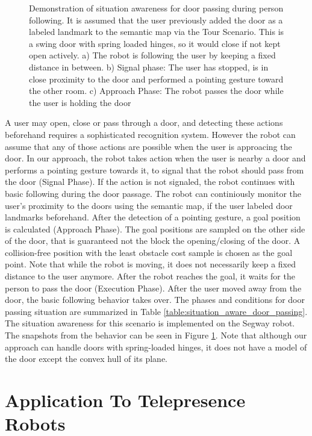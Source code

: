 \begin{figure}[ht!]
{        }
    \caption{Demonstration of situation awareness for door passing during person following. It is assumed that the user previously added the door as a labeled landmark to the semantic map via the Tour Scenario. This is a swing door with spring loaded hinges, so it would close if not kept open actively. a) The robot is following the user by keeping a fixed distance in between. b) Signal phase: The user has stopped, is in close proximity to the door and performed a pointing gesture toward the other room. c) Approach Phase: The robot passes the door while the user is holding the door}
   \label{fig:situtation_aware_door_passing}
\end{figure}

A user may open, close or pass through a door, and detecting these actions beforehand requires a sophisticated recognition system. However the robot can assume that any of those actions are possible when the user is approacing the door. In our approach, the robot takes action when the user is nearby a door and performs a pointing gesture towards it, to signal that the robot should pass from the door (Signal Phase). If the action is not signaled, the robot continues with basic following during the door passage. The robot can continiously monitor the user's proximity to the doors using the semantic map, if the user labeled door landmarks beforehand. After the detection of a pointing gesture, a goal position is calculated (Approach Phase). The goal positions are sampled on the other side of the door, that is guaranteed not the block the opening/closing of the door. A collision-free position with the least obstacle cost sample is chosen as the goal point. Note that while the robot is moving, it does not necessarily keep a fixed distance to the user anymore. After the robot reaches the goal, it waits for the person to pass the door (Execution Phase). After the user moved away from the door, the basic following behavior takes over.  The phases and conditions for door passing situation are summarized in Table \ref{table:situation_aware_door_passing}. The situation awareness for this scenario is implemented on the Segway robot. The snapshots from the behavior can be seen in Figure \ref{fig:situtation_aware_door_passing}. Note that although our approach can handle doors with spring-loaded hinges, it does not have a model of the door except the convex hull of its plane.


\section{Application To Telepresence Robots}
\label{sec:following_application_to_telepresence}

